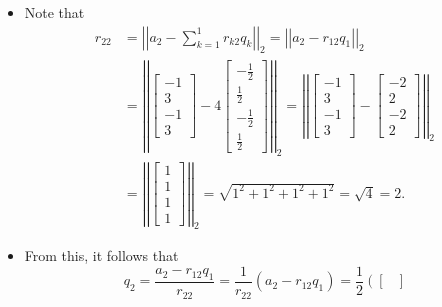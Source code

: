 \documentclass[letterpaper]{article}
\newcommand{\0}{\mathbf{0}}
\begin{document}
\begin{mdframed}
    \begin{mdframed}
        \begin{itemize}
            \item Note that 
            \begin{equation*}
                \begin{aligned}
                    r_{22} &= \left|\left| a_2 - \sum_{k = 1}^{1} r_{k2} q_k \right|\right|_2 = \left|\left| a_2 - r_{12} q_1 \right|\right|_2 \\ 
                        &= \left|\left| \begin{bmatrix}
                            -1 \\ 3 \\ -1 \\ 3
                        \end{bmatrix} - 4 \begin{bmatrix}
                            -\frac{1}{2} \\ \frac{1}{2} \\ -\frac{1}{2} \\ \frac{1}{2}
                        \end{bmatrix} \right|\right|_2 = \left|\left| \begin{bmatrix}
                            -1 \\ 3 \\ -1 \\ 3
                        \end{bmatrix} - \begin{bmatrix}
                            -2 \\ 2 \\ -2 \\ 2
                        \end{bmatrix} \right|\right|_2 \\ 
                        &= \left|\left| \begin{bmatrix}
                            1 \\ 1 \\ 1 \\ 1
                        \end{bmatrix} \right|\right|_2 = \sqrt{1^2 + 1^2 + 1^2 + 1^2} = \sqrt{4} = 2.
                \end{aligned}
            \end{equation*}
            \item From this, it follows that 
            \[q_2 = \frac{a_2 - r_{12} q_1}{r_{22}} = \frac{1}{r_{22}}(a_2 - r_{12} q_1) = \frac{1}{2}\left(\begin{bmatrix}

\end{bmatrix}\]
\end{itemize}
\end{mdframed}
\end{mdframed}
\end{document}
